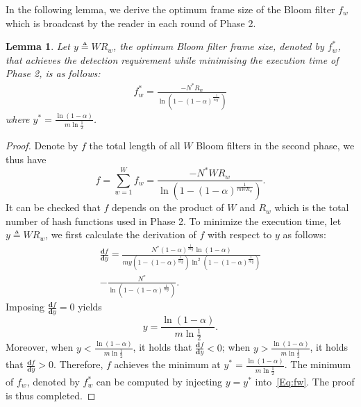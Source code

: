 \documentclass[10pt, twocolumn]{IEEEtran}
\newtheorem{lemma}{Lemma}
\begin{document}
In the following lemma, we derive the optimum frame size of the Bloom filter $f_w$ which is broadcast by the reader in each round of Phase 2.
\begin{lemma}
\label{Lem:Par_II}
Let $y\triangleq W R_w$, the optimum Bloom filter frame size, denoted by $f_w^*$, that achieves the detection requirement while minimising the execution time of Phase 2, is as follows:
\begin{align}
f_w^* = \frac{-N^* R_w}{\ln (1- (1-\alpha)^{\frac{1}{m y^*}})}
\label{Eq:fw_op}
\end{align}
where $y^*= \frac{\ln (1-\alpha)}{m \ln \frac{1}{2}}$.
\end{lemma}
\begin{proof}
Denote by $f$ the total length of all $W$ Bloom filters in the second phase, we thus have
\begin{equation}
f = {\sum_{w=1}^{W}{f_w}}
  = \frac{-N^* W R_w}{\ln (1- (1-\alpha)^{\frac{1}{m W R_w}})}.
\label{Eq:f_M_alpha}
\end{equation}
It can be checked that $f$ depends on the product of $W$ and $R_w$ which is the total number of hash functions used in Phase 2.
To minimize the execution time, let $y\triangleq W R_w$, we first calculate the derivation of $f$ with respect to $y$ as follows:
\begin{multline*}
\frac{\mathbf{d}f}{\mathbf{d}y}
= \frac{ N^* (1-\alpha)^{\frac{1}{m y}} \ln(1-\alpha)}{m y (1-(1-\alpha)^{\frac{1}{m y}}) \ln^2 (1-(1-\alpha)^{\frac{1}{m y}})} \\
- \frac{N^*}{\ln(1-(1-\alpha)^{\frac{1}{m y}})}.
\end{multline*}
Imposing $\frac{\mathbf{d}f}{\mathbf{d}y}=0$ yields
\begin{equation*}
y= \frac{\ln (1-\alpha)}{m \ln \frac{1}{2}}.
\end{equation*}
Moreover, when $y<\frac{\ln (1-\alpha)}{m \ln \frac{1}{2}}$, it holds that $\frac{\mathbf{d}f}{\mathbf{d}y}<0$; when $y>\frac{\ln (1-\alpha)}{m \ln \frac{1}{2}}$, it holds that $\frac{\mathbf{d}f}{\mathbf{d}y}>0$. Therefore, $f$ achieves the minimum at $y^*= \frac{\ln (1-\alpha)}{m \ln \frac{1}{2}}$. The minimum of $f_w$, denoted by $f_w^*$ can be computed by injecting $y=y^*$ into~\eqref{Eq:fw}. The proof is thus completed.
\end{proof}
\end{document}
